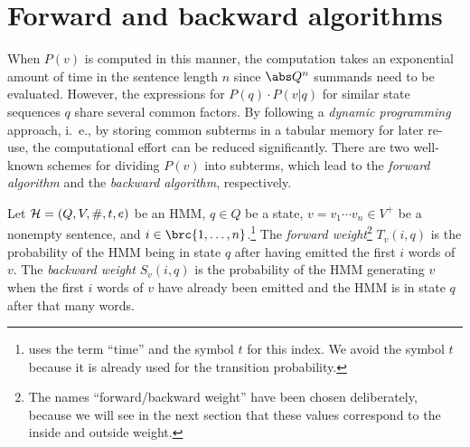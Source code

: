 \section{Forward and backward algorithms}

When $P(v)$ is computed in this manner, the computation takes an exponential
amount of time in the sentence length $n$ since $\abs Q^n$ summands need to be
evaluated. However, the expressions for $P(q)\cdot P(v|q)$ for similar state
sequences $q$ share several common factors. By following a \emph{dynamic
programming} approach, i.~e., by storing common subterms in a tabular memory
for later re-use, the computational effort can be reduced significantly. There
are two well-known schemes for dividing $P(v)$ into subterms, which lead to the
\emph{forward algorithm} and the \emph{backward algorithm}, respectively.

\begin{definition}
 Let $\mathcal H=(Q,V,\#,t,e)$ be an HMM, $q\in Q$ be a state, $v=v_1\cdots v_n\in V^+$
 be a nonempty sentence, and $i\in\brc{1,\ldots,n}$.\footnote{\cite{jm09} uses
 the term ``time'' and the symbol $t$ for this index. We avoid the symbol $t$
 because it is already used for the transition probability.} The \emph{forward
 weight}\footnote{The names ``forward/backward weight'' have been chosen
 deliberately, because we will see in the next section that these values
 correspond to the inside and outside weight.} $T_v(i,q)$ is the probability
 of the HMM being in state $q$ after having emitted the first $i$ words of
 $v$. The \emph{backward weight} $S_v(i,q)$ is the probability of the HMM
 generating $v$ when the first $i$ words of $v$ have already been emitted and
 the HMM is in state $q$ after that many words.
\end{definition}

